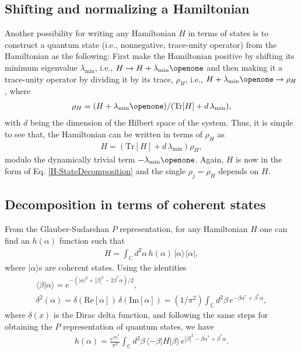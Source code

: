 \documentclass[aps,pra,twocolumn,floatfix,groupedaddress,superscriptaddress,nofootinbib,notitlepage]{revtex4-2}
\begin{document}
\subsection{Shifting and normalizing a Hamiltonian}

Another possibility for writing any Hamiltonian $H$ in terms of states is to construct a quantum state (i.e., nonnegative, trace-unity operator) from the Hamiltonian as the following: First make the Hamiltonian positive by shifting its minimum eigenvalue $\lambda_{\min}$, i.e., $H \rightarrow H + \lambda_{\min} \openone $ and then making it a trace-unity operator by dividing it by its trace, $\rho_{H}$, i.e., $H + \lambda_{\min} \openone  \rightarrow \rho_{H} $, where 
\begin{align}
\rho_{H} = (H+\lambda_{\min} \openone )/(\mathrm{Tr}[H]+d\, \lambda_{\min}),
 \end{align}
 with $d$ being the dimension of the Hilbert space of the system. Thus, it is simple to see that, the Hamiltonian can be written in terms of $\rho_{H}$ as
\begin{align}
H = (\mathrm{Tr}[H]+d\, \lambda_{\min}) \rho_{H},
\label{rho_H}
\end{align}
modulo the dynamically trivial term $- \lambda_{\min} \openone$. Again, $H$ is now in the form of Eq. \eqref{H-StateDecomposition} and the single $\rho_{j}=\rho_{H}$ depends on $H$.
\subsection{Decomposition in terms of coherent states}

From the Glauber-Sudarshan $P$ representation, for any Hamiltonian $H$ one can find an $h(\alpha)$ function such that
\begin{align}
H= \textstyle{\int_{\mathds{C}}} d^{2}\alpha\, h(\alpha)\, |\alpha\rangle \langle \alpha|,
\end{align}
where $|\alpha\rangle$s are coherent states. Using the identities 
\begin{gather}
\langle \beta|\alpha \rangle  = e^{-(|\alpha|^{2}+|\beta|^{2} - 2\beta^{*}\alpha)/2},\\
\delta^{2}(\alpha)  = \delta(\mathrm{Re}[\alpha])\, \delta(\mathrm{Im}[\alpha]) =  (1/\pi^{2}) \textstyle{\int_{\mathds{C}}} d^{2} \beta \, e^{-\beta \alpha^{*} + \beta^{*}\alpha},
\end{gather}
where $\delta(x)$ is the Dirac delta function, and following the same steps for obtaining the $P$ representation of quantum states, we have
\begin{align}
h(\alpha)= \frac{e^{|\alpha|^{2}}}{\pi^{2}} \textstyle{\int_{\mathds{C}}} d^{2} \beta \,\langle -\beta| H |\beta\rangle\, e^{|\beta|^{2}-\beta \alpha^{*} + \beta^{*} \alpha} .
\end{align}
\end{document}
